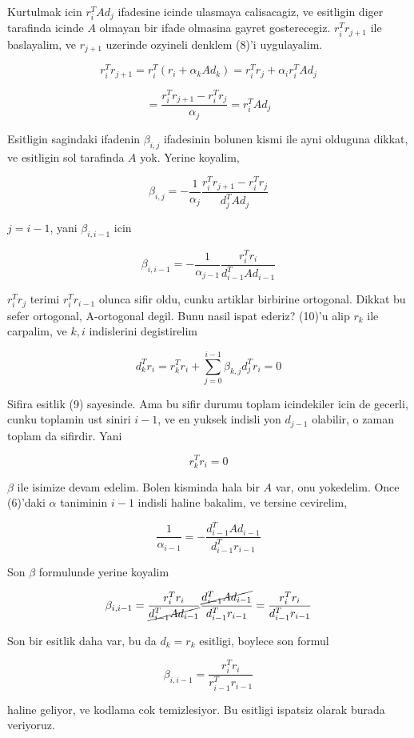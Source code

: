 \documentclass[12pt,fleqn]{article}\usepackage{../common}
\begin{document}
Kurtulmak icin $r_i^TAd_j$ ifadesine icinde ulasmaya calisacagiz, ve
esitligin diger tarafinda icinde $A$ olmayan bir ifade olmasina gayret
gosterecegiz. $r_i^Tr_{j+1}$ ile baslayalim, ve $r_{j+1}$ uzerinde ozyineli
denklem (8)'i uygulayalim. 

\[ r_i^Tr_{j+1} = r_i^T (r_i + \alpha_k A d_k)  = r_i^Tr_j + \alpha_i r_i^TAd_j \]

\[ = \frac{ r_i^Tr_{j+1} - r_i^Tr_j }{\alpha_j} =  r_i^TAd_j \]

Esitligin sagindaki ifadenin $\beta_{i,j}$ ifadesinin bolunen kismi ile
ayni olduguna dikkat, ve esitligin sol tarafinda $A$ yok. Yerine koyalim, 

\[ \beta_{i,j} = - \frac{ 1}{\alpha_j}\frac{  r_i^Tr_{j+1} - r_i^Tr_j }{d_j^TAd_j} \]

$j = i -1$, yani $\beta_{i,i-1}$ icin

\[ \beta_{i,i-1} = - \frac{ 1}{\alpha_{j-1}}\frac{  r_i^Tr_i  }{d_{i-1}^TAd_{i-1}} \]

$r_i^Tr_j$ terimi $r_i^Tr_{i-1}$ olunca sifir oldu, cunku artiklar birbirine ortogonal. 
Dikkat bu sefer ortogonal, A-ortogonal degil. Bunu nasil ispat ederiz? 
(10)'u alip $r_k$ ile carpalim, ve $k,i$ indislerini degistirelim

\[ d_k^Tr_i = r_k^Tr_i + \sum _{ j=0}^{i-1} \beta_{k,j}d_j ^Tr_i = 0
\]

Sifira esitlik (9) sayesinde. Ama bu sifir durumu toplam icindekiler icin
de gecerli, cunku toplamin ust siniri $i-1$, ve en yuksek indisli yon
$d_{j-1}$ olabilir, o zaman toplam da sifirdir. Yani

\[  r_k^Tr_i  = 0 \]

$\beta$ ile isimize devam edelim. Bolen kisminda hala bir $A$ var, onu
yokedelim. Once (6)'daki $\alpha$ taniminin $i-1$ indisli haline bakalim, ve
tersine cevirelim, 

\[ \frac{ 1}{\alpha_{i-1}} = -\frac{d_{i-1}^T A d_{i-1} }{d_{i-1}^Tr_{i-1}} 
\]

Son $\beta$ formulunde yerine koyalim

\[ \beta_{i,i-1} = 
\frac{  r_i^Tr_i  }{ \cancel{d_{i-1}^TAd_{i-1}}} 
\frac{\cancel{d_{i-1}^T A d_{i-1}}}{d_{i-1}^Tr_{i-1}}
= 
\frac{  r_i^Tr_i  }{d_{i-1}^Tr_{i-1}}
\]


Son bir esitlik daha var, bu da $d_k = r_k$ esitligi, boylece son formul

\[ \beta_{i,i-1} = 
\frac{  r_i^Tr_i  }{r_{i-1}^Tr_{i-1}}
\]

haline geliyor, ve kodlama cok temizlesiyor. Bu esitligi ispatsiz olarak
burada veriyoruz. 



\end{document}
